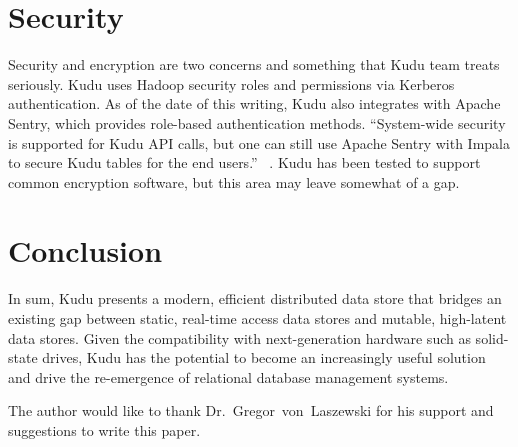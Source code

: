 \section{Security} 
Security and encryption are two concerns and something that Kudu team treats seriously. Kudu uses Hadoop security roles and permissions via Kerberos authentication. As of the date of this writing, Kudu also integrates with Apache Sentry, which provides role-based authentication methods. ``System-wide security is supported for Kudu API calls, but one can still use Apache Sentry with Impala to secure Kudu tables for the end users.'' ~\cite{hid-sp18-407-benchmarking-kudu}. Kudu has been tested to support common encryption software, but this area may leave somewhat of a gap. 

\section{Conclusion}
In sum, Kudu presents a modern, efficient distributed data store that bridges an existing gap between static, real-time access data stores and mutable, high-latent data stores. Given the compatibility with next-generation hardware such as solid-state drives, Kudu has the potential to become an increasingly useful solution and drive the re-emergence of relational database management systems.

\begin{acks}
The author would like to thank Dr.~Gregor~von~Laszewski for his support and suggestions to write this paper.
\end{acks}



